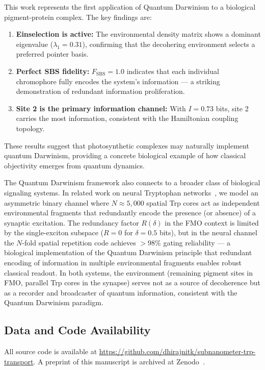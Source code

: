 \documentclass[aps,njp,twocolumn,showpacs,superscriptaddress]{revtex4-2}
\begin{document}
This work represents the first application of Quantum Darwinism to a biological pigment-protein complex. The key findings are:

\begin{enumerate}
\item \textbf{Einselection is active:} The environmental density matrix shows a dominant eigenvalue ($\lambda_1 = 0.31$), confirming that the decohering environment selects a preferred pointer basis.
\item \textbf{Perfect SBS fidelity:} $F_{\mathrm{SBS}} = 1.0$ indicates that each individual chromophore fully encodes the system's information --- a striking demonstration of redundant information proliferation.
\item \textbf{Site 2 is the primary information channel:} With $I = 0.73$ bits, site 2 carries the most information, consistent with the Hamiltonian coupling topology.
\end{enumerate}

These results suggest that photosynthetic complexes may naturally implement quantum Darwinism, providing a concrete biological example of how classical objectivity emerges from quantum dynamics.

The Quantum Darwinism framework also connects to a broader class of biological signaling systems. In related work on neural Tryptophan networks~\cite{TrpCCO2026}, we model an asymmetric binary channel where $N \approx 5,000$ spatial Trp cores act as independent environmental fragments that redundantly encode the presence (or absence) of a synaptic excitation. The redundancy factor $R(\delta)$ in the FMO context is limited by the single-exciton subspace ($R = 0$ for $\delta = 0.5$ bits), but in the neural channel the $N$-fold spatial repetition code achieves $>98\%$ gating reliability — a biological implementation of the Quantum Darwinism principle that redundant encoding of information in multiple environmental fragments enables robust classical readout. In both systems, the environment (remaining pigment sites in FMO, parallel Trp cores in the synapse) serves not as a source of decoherence but as a recorder and broadcaster of quantum information, consistent with the Quantum Darwinism paradigm.

\subsection{Data and Code Availability}

All source code is available at \url{https://github.com/dhirajnitk/subnanometer-trp-transport}. A preprint of this manuscript is archived at Zenodo~\cite{DarwinZenodo2026}.
\end{document}
